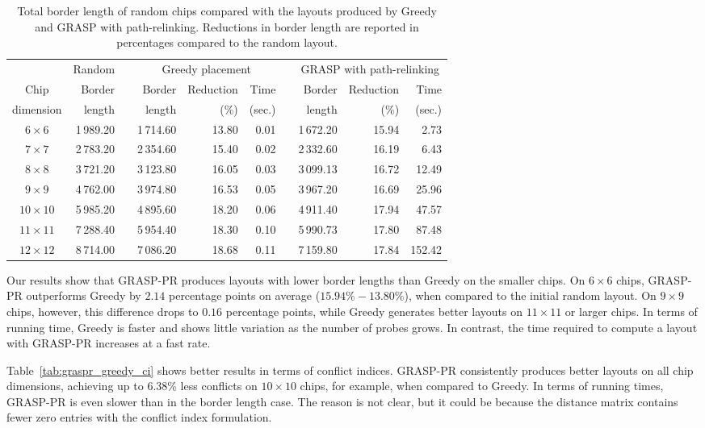 \begin{table}[t]\centering
\caption{\label{tab:graspr_greedy_bl}
  Total border length of random chips compared with the layouts produced by
  Greedy and GRASP with path-relinking. Reductions in border length are reported
  in percentages compared to the random layout.}
\footnotesize{
\begin{tabular}{crcrrrcrrr}
          & Random & & \multicolumn{3}{c}{Greedy placement}  & & \multicolumn{3}{c}{GRASP with path-relinking}  \\ \cline{2-2} \cline{4-6} \cline{8-10}
Chip      & Border & & Border & Reduction & Time             & & Border & Reduction & Time   \\
dimension & length & & length & (\%)      & (sec.)           & & length & (\%)      & (sec.) \\
\hline
$6\times 6$   & 1\,989.20 & & 1\,714.60 & 13.80 & 0.01 & & 1\,672.20 & 15.94 &   2.73 \\
$7\times 7$   & 2\,783.20 & & 2\,354.60 & 15.40 & 0.02 & & 2\,332.60 & 16.19 &   6.43 \\
$8\times 8$   & 3\,721.20 & & 3\,123.80 & 16.05 & 0.03 & & 3\,099.13 & 16.72 &  12.49 \\
$9\times 9$   & 4\,762.00 & & 3\,974.80 & 16.53 & 0.05 & & 3\,967.20 & 16.69 &  25.96 \\
$10\times 10$ & 5\,985.20 & & 4\,895.60 & 18.20 & 0.06 & & 4\,911.40 & 17.94 &  47.57 \\
$11\times 11$ & 7\,288.40 & & 5\,954.40 & 18.30 & 0.10 & & 5\,990.73 & 17.80 &  87.48 \\
$12\times 12$ & 8\,714.00 & & 7\,086.20 & 18.68 & 0.11 & & 7\,159.80 & 17.84 & 152.42 \\
\hline
\end{tabular}}
\end{table}

Our results show that GRASP-PR produces layouts with lower border lengths than
Greedy on the smaller chips. On $6\times 6$ chips, GRASP-PR outperforms Greedy
by $2.14$ percentage points on average ($15.94\% - 13.80\%$), when compared to
the initial random layout. On $9\times 9$ chips, however, this difference drops
to $0.16$ percentage points, while Greedy generates better layouts on
$11\times 11$ or larger chips. In terms of running time, Greedy is faster and
shows little variation as the number of probes grows. In contrast, the time
required to compute a layout with GRASP-PR increases at a fast rate.

Table~\ref{tab:graspr_greedy_ci} shows better results in terms of conflict
indices. GRASP-PR consistently produces better layouts on all chip dimensions,
achieving up to $6.38$\% less conflicts on $10\times 10$ chips, for example,
when compared to Greedy. In terms of running times, GRASP-PR is even slower than
in the border length case. The reason is not clear, but it could be because the
distance matrix contains fewer zero entries with the conflict index formulation.

